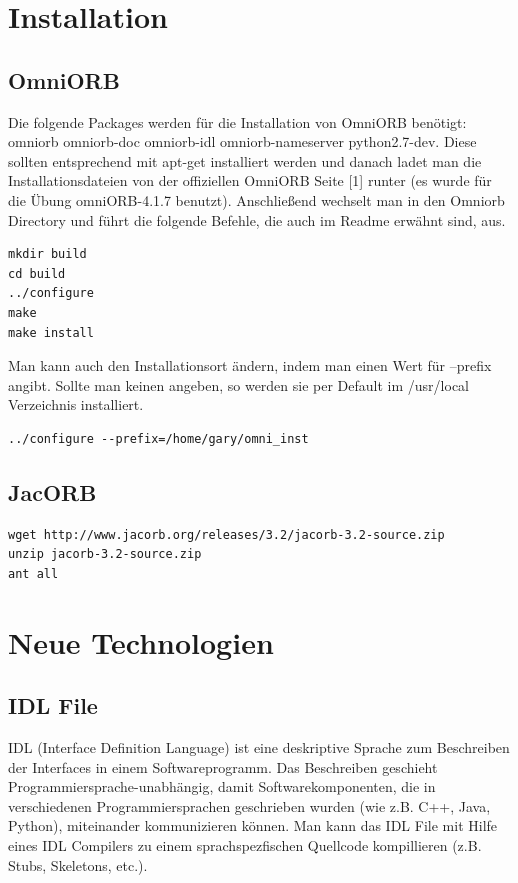 \documentclass[11pt]{article}
\begin{document}
\section{Installation}

\subsection{OmniORB}

Die folgende Packages werden für die Installation von OmniORB benötigt: omniorb omniorb-doc omniorb-idl omniorb-nameserver python2.7-dev. Diese sollten entsprechend mit apt-get installiert werden und danach ladet man die Installationsdateien von der offiziellen OmniORB Seite [1] runter (es wurde für die Übung omniORB-4.1.7 benutzt). Anschließend wechselt man in den Omniorb Directory und führt die folgende Befehle, die auch im Readme erwähnt sind, aus.

\begin{lstlisting}
mkdir build
cd build
../configure
make
make install
\end{lstlisting}

Man kann auch den Installationsort ändern, indem man einen Wert für --prefix angibt. Sollte man keinen angeben, so werden sie per Default im /usr/local Verzeichnis installiert.

\begin{lstlisting}
../configure --prefix=/home/gary/omni_inst
\end{lstlisting}

\subsection{JacORB}

\begin{lstlisting}
wget http://www.jacorb.org/releases/3.2/jacorb-3.2-source.zip
unzip jacorb-3.2-source.zip
ant all
\end{lstlisting}

\section{Neue Technologien}

\subsection{IDL File}

IDL (Interface Definition Language) ist eine deskriptive Sprache zum Beschreiben der Interfaces in einem Softwareprogramm. Das Beschreiben geschieht Programmiersprache-unabhängig, damit Softwarekomponenten, die in verschiedenen Programmiersprachen geschrieben wurden (wie z.B. C++, Java, Python), miteinander kommunizieren können. Man kann das IDL File mit Hilfe eines IDL Compilers zu einem sprachspezfischen Quellcode kompillieren (z.B. Stubs, Skeletons, etc.). 
\end{document}
